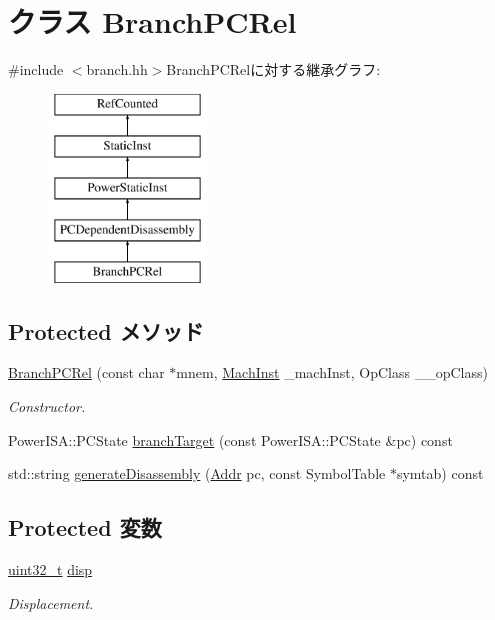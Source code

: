 \hypertarget{classPowerISA_1_1BranchPCRel}{
\section{クラス BranchPCRel}
\label{classPowerISA_1_1BranchPCRel}
}


{\ttfamily \#include $<$branch.hh$>$}BranchPCRelに対する継承グラフ:\begin{figure}[H]
\begin{center}
\leavevmode
\includegraphics[height=5cm]{classPowerISA_1_1BranchPCRel}
\end{center}
\end{figure}
\subsection*{Protected メソッド}
\begin{DoxyCompactItemize}
\item 
\hyperlink{classPowerISA_1_1BranchPCRel_ada70cbd51e3d10b3d1bd1bd6ab517e08}{BranchPCRel} (const char $\ast$mnem, \hyperlink{namespacePowerISA_a301c22ea09fa33dcfe6ddf22f203699c}{MachInst} \_\-machInst, OpClass \_\-\_\-opClass)
\begin{DoxyCompactList}\small\item\em Constructor. \item\end{DoxyCompactList}\item 
PowerISA::PCState \hyperlink{classPowerISA_1_1BranchPCRel_a860401b0a6432ac5dbe246c64448d56d}{branchTarget} (const PowerISA::PCState \&pc) const 
\item 
std::string \hyperlink{classPowerISA_1_1BranchPCRel_a95d323a22a5f07e14d6b4c9385a91896}{generateDisassembly} (\hyperlink{base_2types_8hh_af1bb03d6a4ee096394a6749f0a169232}{Addr} pc, const SymbolTable $\ast$symtab) const 
\end{DoxyCompactItemize}
\subsection*{Protected 変数}
\begin{DoxyCompactItemize}
\item 
\hyperlink{Type_8hh_a435d1572bf3f880d55459d9805097f62}{uint32\_\-t} \hyperlink{classPowerISA_1_1BranchPCRel_a0c5598bcc641a0989f32ce0b0ea29bb3}{disp}
\begin{DoxyCompactList}\small\item\em Displacement. \item\end{DoxyCompactList}\end{DoxyCompactItemize}


